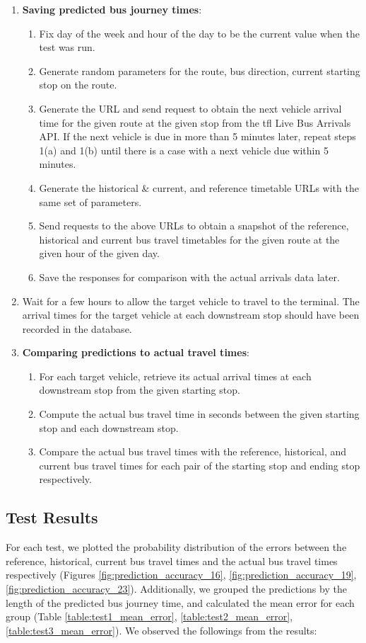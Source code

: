 \begin{enumerate}
  \item \textbf{Saving predicted bus journey times}:
  \begin{enumerate}
    \item Fix day of the week and hour of the day to be the current value when the test was run.
    \item Generate random parameters for the route, bus direction, current starting stop on the route.
    \item Generate the URL and send request to obtain the next vehicle arrival time for the given route at the given stop from the \acrshort{tfl} Live Bus Arrivals API. If the next vehicle is due in more than 5 minutes later, repeat steps 1(a) and 1(b) until there is a case with a next vehicle due within 5 minutes.
    \item  Generate the historical \& current, and reference timetable URLs with the same set of parameters.
    \item Send requests to the above URLs to obtain a snapshot of the reference, historical and current bus travel timetables for the given route at the given hour of the given day.
    \item Save the responses for comparison with the actual arrivals data later.
  \end{enumerate}
  \item Wait for a few hours to allow the target vehicle to travel to the terminal. The arrival times for the target vehicle at each downstream stop should have been recorded in the database.
  \item \textbf{Comparing predictions to actual travel times}:
  \begin{enumerate}
    \item For each target vehicle, retrieve its actual arrival times at each downstream stop from the given starting stop.
    \item Compute the actual bus travel time in seconds between the given starting stop and each downstream stop.
    \item Compare the actual bus travel times with the reference, historical, and current bus travel times for each pair of the starting stop and ending stop respectively.
  \end{enumerate}
\end{enumerate}

\subsection{Test Results}
\par For each test, we plotted the probability distribution of the errors between the reference, historical, current bus travel times and the actual bus travel times respectively (Figures \ref{fig:prediction_accuracy_16}, \ref{fig:prediction_accuracy_19}, \ref{fig:prediction_accuracy_23}). Additionally, we grouped the predictions by the length of the predicted bus journey time, and calculated the mean error for each group (Table \ref{table:test1_mean_error}, \ref{table:test2_mean_error}, \ref{table:test3_mean_error}). We observed the followings from the results:

